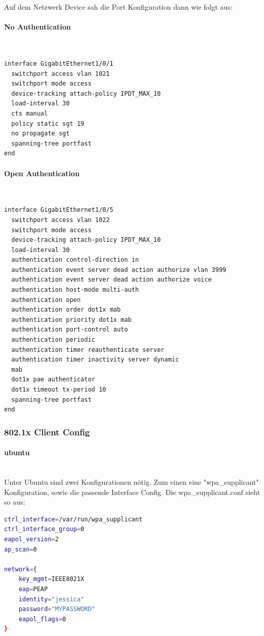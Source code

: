 Auf dem Netzwerk Device sah die Port Konfiguration dann wie folgt aus:

\paragraph{No Authentication}
~\\
\begin{lstlisting}[language=bash]
interface GigabitEthernet1/0/1
  switchport access vlan 1021
  switchport mode access
  device-tracking attach-policy IPDT_MAX_10
  load-interval 30
  cts manual 
  policy static sgt 19
  no propagate sgt
  spanning-tree portfast
end
\end{lstlisting}
\paragraph{Open Authentication}
~\\
\begin{lstlisting}[language=bash]
interface GigabitEthernet1/0/5
  switchport access vlan 1022
  switchport mode access
  device-tracking attach-policy IPDT_MAX_10
  load-interval 30
  authentication control-direction in
  authentication event server dead action authorize vlan 3999
  authentication event server dead action authorize voice
  authentication host-mode multi-auth
  authentication open
  authentication order dot1x mab
  authentication priority dot1x mab
  authentication port-control auto
  authentication periodic
  authentication timer reauthenticate server
  authentication timer inactivity server dynamic
  mab
  dot1x pae authenticator
  dot1x timeout tx-period 10
  spanning-tree portfast
end
\end{lstlisting}

\subsubsection{802.1x Client Config}

\paragraph{ubuntu}
~\\

Unter Ubuntu sind zwei Konfigurationen nötig. Zum einen eine "wpa\_supplicant" Konfiguration, sowie die passende Interface Config.
Die wpa\_supplicant.conf sieht so aus:

\begin{lstlisting}[language=bash]
ctrl_interface=/var/run/wpa_supplicant
ctrl_interface_group=0
eapol_version=2
ap_scan=0

network={
	key_mgmt=IEEE8021X
	eap=PEAP
	identity="jessica"
	password="MYPASSWORD"
	eapol_flags=0
}
\end{lstlisting}

